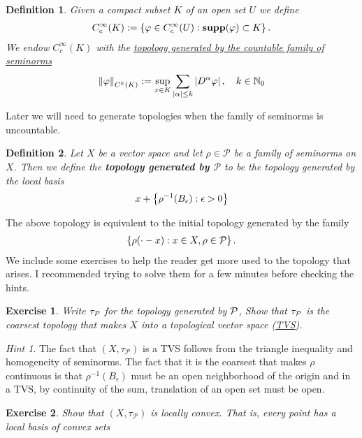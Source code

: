 \documentclass[12pt]{article}
\newtheorem{definition}{Definition}
\newtheorem{exercise}{Exercise}
\theoremstyle{remark}
\newtheorem*{hint}{Hint}
\renewcommand{\norm}[1]{\left\lVert #1 \right\rVert}\renewcommand{\abs}[1]{\left| #1 \right|}
\begin{document}
\begin{definition}
	Given a compact subset $K$ of an open set  $U$ we define
	\begin{align*}
		C_c^\infty(K):= \left\{\varphi \in C_c^\infty(U): \mathbf{supp}(\varphi) \subset K \right\} .
	\end{align*}
	We endow  $C_c^\infty(K)$ with the \href{https://nowheredifferentiable.com/2023-01-29-PDE-1-Fourier/#:~:text=together-,with,-a%20countable%20family}{topology generated  by the countable family of seminorms}
	\begin{align}\label{local smooth norms}
		\norm{\varphi}_{C^k(K)}:= \sup_{x \in K} \sum_{\abs{\alpha}\leq k } \abs{D^\alpha \varphi}, \quad  k \in \N_{0}
	\end{align}
\end{definition}
Later we will need to generate topologies when the family of seminorms is uncountable.
\begin{definition}
	Let $X$ be a vector space and let $\rho \in \mathcal{P}$ be a family of seminorms on $X$. Then we define the \textbf{topology generated by $\mathcal{P}$} to be the topology generated by the local basis
	\begin{align*}
		x+\left\{\rho^{-1}(B_\epsilon): \epsilon>0\right\}
	\end{align*}
\end{definition}
The above topology is equivalent to the initial topology generated by the family
\begin{align*}
	\left\{\rho(\cdot-x): x\in X, \rho \in \mathcal{P}\right\}.
\end{align*}
We include some exercises to help the reader get more used to the topology that arises. I recommended trying to solve them for a few minutes before checking the hints.
\begin{exercise}\label{TVS ex}
	Write $\tau_{\mathcal{P}}$ for the topology generated by $\mathcal{P}$, Show that $\tau_{\mathcal{P}}$ is the coarsest topology that makes $X$ into a topological vector space (\href{https://en.wikipedia.org/wiki/Topological_vector_space}{TVS}).
\end{exercise}
\begin{hint}
	The fact that $(X,\tau_\mathcal{P})$ is a TVS follows from the triangle inequality and homogeneity of seminorms. The fact that it is the coarsest that makes $\rho$ continuous is that $\rho^{-1}(B_\epsilon)$ must be an open neighborhood of the origin and in a TVS, by continuity of the sum, translation of an open set must be open.
\end{hint}
\begin{exercise}\label{convex ex}
	Show that $(X,\tau_\mathcal{P})$ is locally convex. That is, every point has a local basis of convex sets
\end{exercise}
\end{document}
